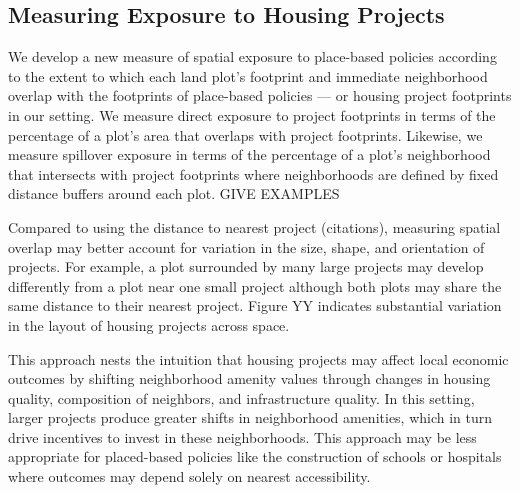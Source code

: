 \documentclass[12pt]{article}
\begin{document}


\subsection{Measuring Exposure to Housing Projects}


We develop a new measure of spatial exposure to place-based policies according to the extent to which each land plot's footprint and immediate neighborhood overlap with the footprints of place-based policies --- or housing project footprints in our setting.  We measure direct exposure to project footprints in terms of the percentage of a plot's area that overlaps with project footprints.  Likewise, we measure spillover exposure in terms of the percentage of a plot's neighborhood that intersects with project footprints where neighborhoods are defined by fixed distance buffers around each plot.  GIVE EXAMPLES

Compared to using the distance to nearest project (citations), measuring spatial overlap may better account for variation in the size, shape, and orientation of projects.  For example, a plot surrounded by many large projects may develop differently from a plot near one small project although both plots may share the same distance to their nearest project.  Figure YY indicates substantial variation in the layout of housing projects across space.  

This approach nests the intuition that housing projects may affect local economic outcomes by shifting neighborhood amenity values through changes in housing quality, composition of neighbors, and infrastructure quality.  In this setting, larger projects produce greater shifts in neighborhood amenities, which in turn drive incentives to invest in these neighborhoods.  This approach may be less appropriate for placed-based policies like the construction of schools or hospitals where outcomes may depend solely on nearest accessibility.  


\end{document}
